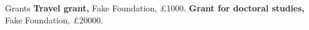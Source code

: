 \begin{rubric}{Grants}
\entry*[2024]
    \textbf{Travel grant,} Fake Foundation, £1000.
%
\entry*[2023]
    \textbf{Grant for doctoral studies,} Fake Foundation, £20000.
\end{rubric}